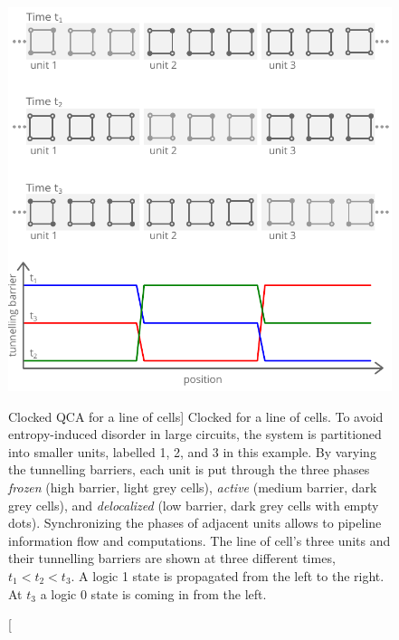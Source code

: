 \begin{figure}
  \center
  \includegraphics{clocking}
  \caption
[Clocked QCA for a line of cells]
{
Clocked  for a line of cells. To avoid entropy-induced disorder in large 
circuits, the system is partitioned into smaller units, labelled 1, 2, and 3 in
this example. By varying the tunnelling barriers, each unit is put through the
three phases \emph{frozen} (high barrier, light grey cells), \emph{active}
(medium barrier, dark grey cells), and \emph{delocalized} (low barrier, dark
grey cells with empty dots). Synchronizing the phases of adjacent units allows
to pipeline information flow and computations. The line of cell's three units
and their tunnelling barriers are shown at three different times, $t_1<t_2<t_3$.
A logic 1 state is propagated from the left to the right. At $t_3$ a logic 0
state is coming in from the left.
}
  \label{fig:clocking}
\end{figure}

